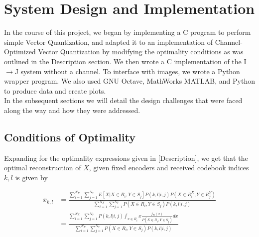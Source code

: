 \section{System Design and Implementation}

In the course of this project, we began by implementing a C program to perform simple Vector Quantization, and adapted it to an implementation of Channel-Optimized Vector Quantization by modifying the optimality conditions as was outlined in the Description section. We then wrote a C implementation of the I$\rightarrow$J system without a channel. To interface with images, we wrote a Python wrapper program. We also used GNU Octave, MathWorks MATLAB, and Python to produce data and create plots.\\

In the subsequent sections we will detail the design challenges that were faced along the way and how they were addressed.

\subsection{Conditions of Optimality}

Expanding for the optimality expressions given in [Description], we get that the optimal reconstruction of $X$, given fixed encoders and received codebook indices $k,l$ is given by

\begin{align}
    x_{k,l}&=
    \frac{
        \sum_{i=1}^{N_X}\sum_{j=1}^{N_Y}
            E[X|X\in R_i, Y\in S_j]P(k,l|i,j)P(X\in R^X_i, Y\in R^Y_j)
    }{
        \sum_{i=1}^{N_X}\sum_{j=1}^{N_Y}
            P(X\in R_i, Y\in S_j)P(k,l|i,j)
    }\\
    &=
    \frac{
        \sum_{i=1}^{N_X}\sum_{j=1}^{N_Y}
            P(k,l|i,j)\int_{x\in R_i}x
                \frac{
                    f_X(x)
                }{
                    P(X\in R_i, Y\in S_j)
                }dx
    }{
        \sum_{i=1}^{N_X}\sum_{j=1}^{N_Y}
            P(X\in R_i, Y\in S_j)P(k,l|i,j)
    }
\end{align}

